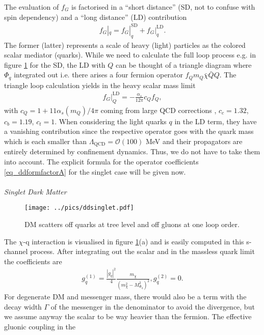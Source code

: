 \noindent The evaluation of $f_G$ is factorised in a ``short distance'' (SD, not to confuse with spin dependency) and a ``long distance'' (LD) 
contribution
\begin{align}
 f_G|_q = f_G|^\text{SD}_q + f_G|^\text{LD}_q. 
\end{align}
The former (latter) represents a scale of heavy (light) particles as the colored scalar mediator (quarks). While we need to calculate the full
loop process e.g. in figure \ref{pic_ddsinglet} for the SD, the LD with $Q$ can be thought of a triangle diagram where $\Phi_q$ integrated 
out i.e. there arises a four fermion operator $f_Q m_Q \bar \chi \bar Q Q$. The triangle loop calculation yields in the heavy scalar mass limit 
\begin{align}
 f_G|_Q^\text{LD} = -\frac{\alpha_s}{12\pi} c_Q f_Q,
 \label{eq_longdistance}
\end{align}
with $c_Q = 1+11\alpha_s(m_Q)/4\pi$ coming from large QCD corrections \cite{Djouadi}, $c_c=1.32$, $c_b = 1.19$, $c_t = 1$.
When considering the light quarks $q$ in the LD term, they have a vanishing contribution since the respective operator goes with the quark mass
which is each smaller than $\Lambda_\text{QCD} = \mathcal{O}(100)$ MeV and their propagators are entirely determined by confinement dynamics. Thus,
we do not have to take them into account. The explicit formula for the operator coefficients \eqref{eq_ddformfactorA} for the singlet case 
will be given now.
\\ \\ \textit{Singlet Dark Matter}\\
\begin{figure}[t]
 \texttt{[image: ../pics/ddsinglet.pdf]}
 \caption{DM scatters off quarks at tree level and off gluons at one loop order.}
 \label{pic_ddsinglet}
\end{figure}
The $\chi$-q interaction is visualised in figure \ref{pic_ddsinglet}(a) and is easily computed in this s-channel process. After integrating out the 
scalar and in the massless quark limit the coefficients are
\begin{align}
 g_q^{(1)} = \frac{|g_q|^2 }{4} \frac{m_\chi}{\left(m_\chi^2 - M_{\Phi_q}^2\right)^2},
 g_q^{(2)} = 0.
\end{align}
For degenerate DM and messenger mass, there would also be a term with the decay width $\Gamma$ of the messenger in the denominator to avoid the 
divergence, but we assume anyway the scalar to be way heavier than the fermion. %
The effective gluonic coupling in the 
